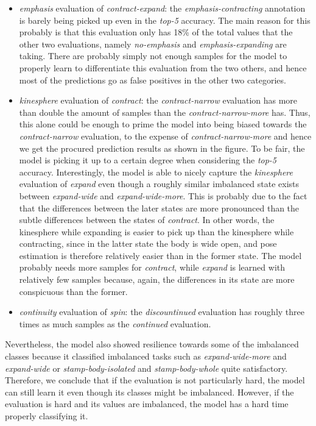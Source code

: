 \documentclass[extern,palatino]{cgMA}
\begin{document}
\begin{itemize}
    \item \textit{emphasis} evaluation of \textit{contract-expand}: the \textit{emphasis-contracting} annotation is barely being picked up even in the \textit{top-5} accuracy. The main reason for this probably is that this evaluation only has 18\% of the total values that the other two evaluations, namely \textit{no-emphasis} and \textit{emphasis-expanding} are taking. There are probably simply not enough samples for the model to properly learn to differentiate this evaluation from the two others, and hence most of the predictions go as false positives in the other two categories.
    \item \textit{kinesphere} evaluation of \textit{contract}: the \textit{contract-narrow} evaluation has more than double the amount of samples than the \textit{contract-narrow-more} has. Thus, this alone could be enough to prime the model into being biased towards the \textit{contract-narrow} evaluation, to the expense of \textit{contract-narrow-more} and hence we get the procured prediction results as shown in the figure. To be fair, the model is picking it up to a certain degree when considering the \textit{top-5} accuracy. Interestingly, the model is able to nicely capture the \textit{kinesphere} evaluation of \textit{expand} even though a roughly similar imbalanced state exists between \textit{expand-wide} and \textit{expand-wide-more}. This is probably due to the fact that the differences between the later states are more pronounced than the subtle differences between the states of \textit{contract}. In other words, the kinesphere while expanding is easier to pick up than the kinesphere while contracting, since in the latter state the body is wide open, and pose estimation is therefore relatively easier than in the former state. The model probably needs more samples for \textit{contract}, while \textit{expand} is learned with relatively few samples because, again, the differences in its state are more conspicuous than the former.
    \item \textit{continuity} evaluation of \textit{spin}: the \textit{discountinued} evaluation has roughly three times as much samples as the \textit{continued} evaluation.
\end{itemize}

\noindent Nevertheless, the model also showed resilience towards some of  the imbalanced classes because it classified imbalanced tasks such as \textit{expand-wide-more} and \textit{expand-wide} or \textit{stamp-body-isolated} and \textit{stamp-body-whole} quite satisfactory. Therefore, we conclude that if the evaluation is not particularly hard, the model can still learn it even though its classes might be imbalanced. However, if the evaluation is hard and its values are imbalanced, the model has a hard time properly classifying it.
\end{document}
